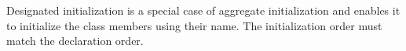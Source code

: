 \begin{tcolorbox}[breakable,enhanced jigsaw,colback=blue!5!white,colframe=blue!75!black,title={Distilled Information}]
Designated initialization is a special case of aggregate initialization and enables it to initialize the class members using their name. The initialization order must match the declaration order.
\end{tcolorbox}	






